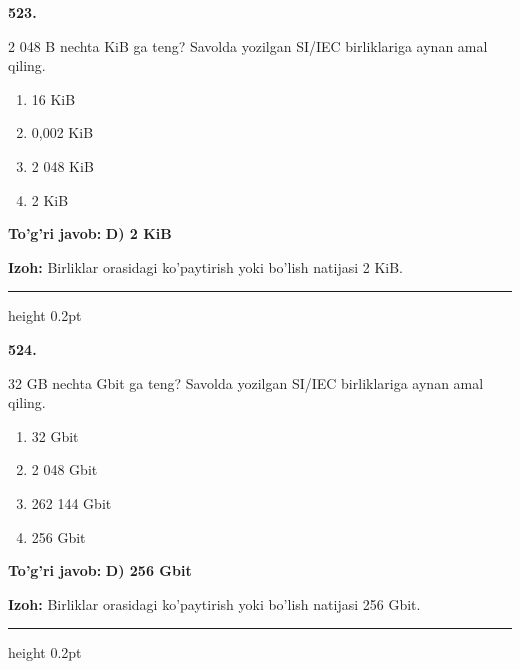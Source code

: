 \documentclass[10pt,a4paper,oneside]{article}
\begin{document}
\noindent\textbf{\color{ink}523.}
\par
2 048 B nechta KiB ga teng? Savolda yozilgan SI/IEC birliklariga aynan amal qiling.
\begin{enumerate}[label=\Alph*),leftmargin=9mm]
\item 16 KiB
\item 0,002 KiB
\item 2 048 KiB
\item 2 KiB
\end{enumerate}
\begin{tcolorbox}[enhanced,breakable,colback=teal!4,colframe=teal!50!black,boxrule=0.5pt,arc=1.1mm,left=3mm,right=3mm,top=1.7mm,bottom=1.7mm,before skip=2mm,after skip=2mm]
\textbf{\color{teal}To'g'ri javob:} \textbf{D) 2 KiB}
\par\smallskip
\textbf{Izoh:} Birliklar orasidagi ko'paytirish yoki bo'lish natijasi 2 KiB.
\end{tcolorbox}
\vspace{2mm}\hrule height 0.2pt \vspace{3mm}

\noindent\textbf{\color{ink}524.}
\par
32 GB nechta Gbit ga teng? Savolda yozilgan SI/IEC birliklariga aynan amal qiling.
\begin{enumerate}[label=\Alph*),leftmargin=9mm]
\item 32 Gbit
\item 2 048 Gbit
\item 262 144 Gbit
\item 256 Gbit
\end{enumerate}
\begin{tcolorbox}[enhanced,breakable,colback=teal!4,colframe=teal!50!black,boxrule=0.5pt,arc=1.1mm,left=3mm,right=3mm,top=1.7mm,bottom=1.7mm,before skip=2mm,after skip=2mm]
\textbf{\color{teal}To'g'ri javob:} \textbf{D) 256 Gbit}
\par\smallskip
\textbf{Izoh:} Birliklar orasidagi ko'paytirish yoki bo'lish natijasi 256 Gbit.
\end{tcolorbox}
\vspace{2mm}\hrule height 0.2pt \vspace{3mm}
\end{document}
